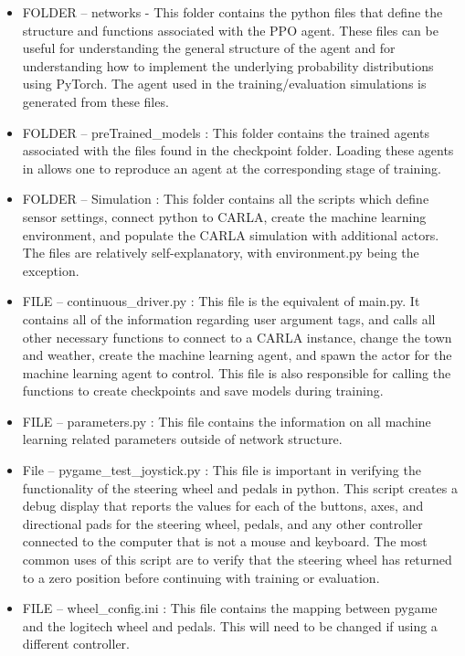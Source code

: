 \documentclass[12pt,oneside,letterpaper]{article}
\begin{document}
\begin{itemize}
\item FOLDER -- networks - This folder contains the python files that define the structure and functions associated with the PPO agent. These files can be useful for understanding the general structure of the agent and for understanding how to implement the underlying probability distributions using PyTorch. The agent used in the training/evaluation simulations is generated from these files.
\item FOLDER -- preTrained\_models : This folder contains the trained agents associated with the files found in the checkpoint folder. Loading these agents in allows one to reproduce an agent at the corresponding stage of training.
\item FOLDER -- Simulation : This folder contains all the scripts which define sensor settings, connect python to CARLA, create the machine learning environment, and populate the CARLA simulation with additional actors. The files are relatively self-explanatory, with environment.py being the exception.
\item FILE -- continuous\_driver.py : This file is the equivalent of main.py. It contains all of the information regarding user argument tags, and calls all other necessary functions to connect to a CARLA instance, change the town and weather, create the machine learning agent, and spawn the actor for the machine learning agent to control. This file is also responsible for calling the functions to create checkpoints and save models during training.
\item FILE -- parameters.py : This file contains the information on all machine learning related parameters outside of network structure.
\item File -- pygame\_test\_joystick.py : This file is important in verifying the functionality of the steering wheel and pedals in python. This script creates a debug display that reports the values for each of the buttons, axes, and directional pads for the steering wheel, pedals, and any other controller connected to the computer that is not a mouse and keyboard. The most common uses of this script are to verify that the steering wheel has returned to a zero position before continuing with training or evaluation.
\item FILE -- wheel\_config.ini : This file contains the mapping between pygame and the logitech wheel and pedals. This will need to be changed if using a different controller.

\end{itemize}
\end{document}
